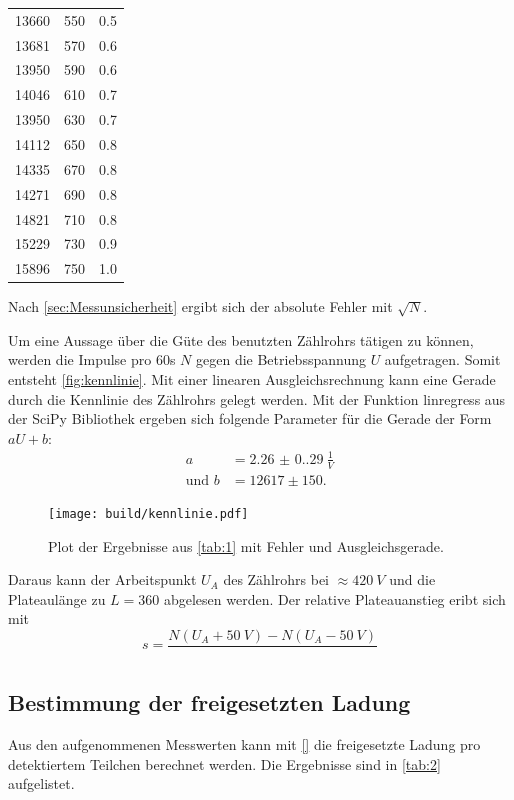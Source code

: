 \begin{table}[H]
\begin{tabular}{c c c}
      13660 & 550 & 0.5\\
      13681 & 570 & 0.6\\
      13950 & 590 & 0.6\\
      14046 & 610 & 0.7\\
      13950 & 630 & 0.7\\
      14112 & 650 & 0.8\\
      14335 & 670 & 0.8\\
      14271 & 690 & 0.8\\
      14821 & 710 & 0.8\\
      15229 & 730 & 0.9\\
      15896 & 750 & 1.0\\
      \bottomrule
  \end{tabular}
  \label{tab:1}
\end{table}

Nach \autoref{sec:Messunsicherheit} ergibt sich der absolute Fehler mit $\sqrt{N}$.

Um eine Aussage über die Güte des benutzten Zählrohrs tätigen zu können, werden die Impulse pro 60s $N$ gegen die
Betriebsspannung $U$ aufgetragen. Somit entsteht \autoref{fig:kennlinie}.
Mit einer linearen Ausgleichsrechnung kann eine Gerade durch die Kennlinie des Zählrohrs gelegt werden.
Mit der Funktion linregress aus der SciPy Bibliothek \cite{scipy} ergeben sich folgende Parameter für die Gerade der Form $aU + b$:
\begin{align*}
  a &= \SI{2.26(0.29)}{\frac{1}{V}}\\
  \text{und } b &= 12617 \pm 150.
\end{align*}

\begin{figure}[H]
  \texttt{[image: build/kennlinie.pdf]}
  \caption{Plot der Ergebnisse aus \autoref{tab:1} mit Fehler und Ausgleichsgerade.}
  \label{fig:kennlinie}
\end{figure}

Daraus kann der Arbeitspunkt $U_A$ des Zählrohrs bei $\approx \SI{420}{V}$ und die Plateaulänge zu $L = 360$ abgelesen werden.
Der relative Plateauanstieg eribt sich mit
\begin{equation*}
  s = \frac{N(U_A + \SI{50}{V}) - N(U_A - \SI{50}{V})}{}
\end{equation*}

\subsection{Bestimmung der freigesetzten Ladung}
Aus den aufgenommenen Messwerten kann mit \autoref{} die freigesetzte Ladung pro detektiertem Teilchen berechnet werden.
Die Ergebnisse sind in \autoref{tab:2} aufgelistet.

